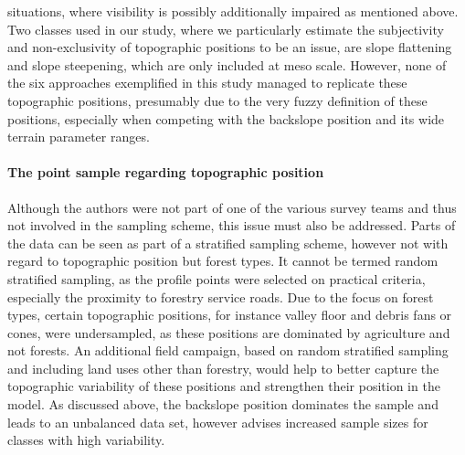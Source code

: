 \documentclass[preprint,12pt,authoryear]{elsarticle}
\begin{document}
situations, where visibility is possibly additionally impaired as mentioned above. Two classes used in our study, where we particularly estimate the subjectivity and non-exclusivity of topographic positions to be an issue, are slope flattening and slope steepening, which are only included at meso scale. However, none of the six approaches exemplified in this study managed to replicate these topographic positions, presumably due to the very fuzzy definition of these positions, especially when competing with the backslope position and its wide terrain parameter ranges.
\paragraph{The point sample regarding topographic position}
Although the authors were not part of one of the various survey teams and thus not involved in the sampling scheme, this issue must also be addressed. Parts of the data can be seen as part of a stratified sampling scheme, however not with regard to topographic position but forest types. It cannot be termed random stratified sampling, as the profile points were selected on practical criteria, especially the proximity to forestry service roads. Due to the focus on forest types, certain topographic positions, for instance valley floor and debris fans or cones, were undersampled, as these positions are dominated by agriculture and not forests. An additional field campaign, based on random stratified sampling and including land uses other than forestry, would help to better capture the topographic variability of these positions and strengthen their position in the model. As discussed above, the backslope position dominates the sample and leads to an unbalanced data set, however \cite{Congalton1991} advises increased sample sizes for classes with high variability.
\end{document}
